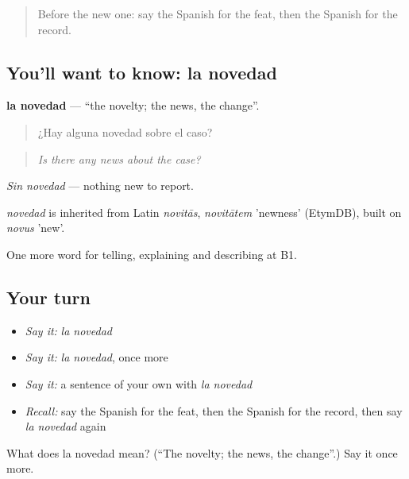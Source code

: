 \label{lesson:ES-C566-novedad}



\begin{quote}
Before the new one: say the Spanish for the feat, then the Spanish for the record.
\end{quote}

\subsection*{You'll want to know: la novedad}
\textbf{la novedad} — \textquotedblleft{}the novelty; the news, the change\textquotedblright{}.

\begin{quote}
¿Hay alguna novedad sobre el caso?
\end{quote}

\begin{quote}
\emph{Is there any news about the case?}
\end{quote}

\emph{Sin novedad} — nothing new to report.

\begin{cousinweb}
\emph{novedad} is inherited from Latin \emph{novitās}, \emph{novitātem} 'newness' (EtymDB), built on \emph{novus} 'new'.
\end{cousinweb}

\begin{grammarlens}[title={What you've built}]
One more word for telling, explaining and describing at B1.
\end{grammarlens}

\subsection*{Your turn}
\begin{itemize}
\raggedright
  \item \emph{Say it:} \emph{la novedad}
  \item \emph{Say it:} \emph{la novedad}, once more
  \item \emph{Say it:} a sentence of your own with \emph{la novedad}
  \item \emph{Recall:} say the Spanish for the feat, then the Spanish for the record, then say \emph{la novedad} again
\end{itemize}

\begin{tcolorbox}[breakable,colback=teal!4,colframe=teal!35!black,title={Before you move on}]
What does la novedad mean? (\textquotedblleft{}The novelty; the news, the change\textquotedblright{}.) Say it once more.
\end{tcolorbox}
